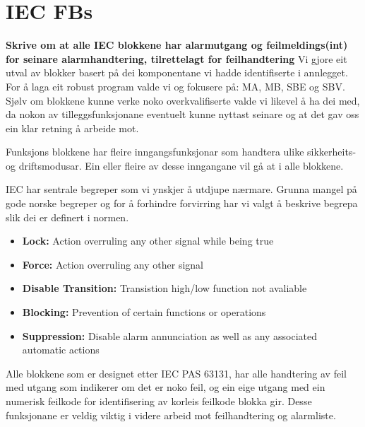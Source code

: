\section{IEC \glspl{FB}}
\thispagestyle{fancy}





\textbf{Skrive om at alle IEC blokkene har alarmutgang og feilmeldings(int) for seinare alarmhandtering, tilrettelagt for feilhandtering}\newline
Vi gjore eit utval av blokker basert på dei komponentane vi hadde identifiserte i annlegget.
For å laga eit robust program valde vi og fokusere på: \gls{MA}, \gls{MB}, \gls{SBE} og \gls{SBV}.
Sjølv om blokkene kunne verke noko overkvalifiserte valde vi likevel å ha dei med, da nokon av tilleggsfunksjonane eventuelt kunne nyttast seinare
og at det gav oss ein klar retning å arbeide mot.

Funksjons blokkene har fleire inngangsfunksjonar som handtera ulike sikkerheits- og driftsmodusar.
Ein eller fleire av desse inngangane vil gå at i alle blokkene.

\gls{IEC} har sentrale begreper som vi ynskjer å utdjupe nærmare. Grunna mangel på gode norske begreper 
og for å forhindre forvirring har vi valgt å beskrive begrepa slik dei er definert i normen.

\begin{itemize}
    \item \textbf{Lock:} Action overruling any other signal while being true
    \item \textbf{Force:} Action overruling any other signal
    \item \textbf{Disable Transition:} Transistion high/low function not avaliable
    \item \textbf{Blocking:} Prevention of certain functions or operations 
    \item \textbf{Suppression:} Disable alarm annunciation as well as any associated automatic actions
\end{itemize}

Alle blokkene som er designet etter IEC PAS 63131, har alle handtering av feil med utgang som indikerer om det er noko feil, og ein eige utgang med ein numerisk feilkode for identifisering av korleis feilkode blokka gir. 
Desse funksjonane er veldig viktig i videre arbeid mot feilhandtering og alarmliste. 

